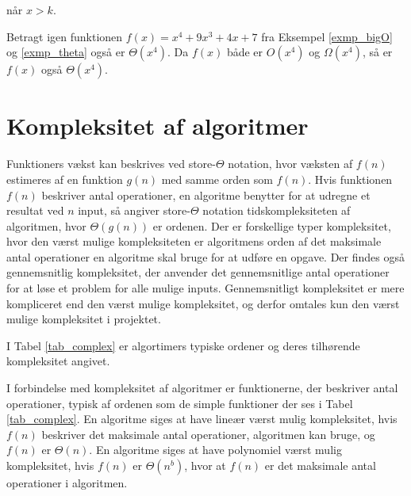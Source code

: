 når $x>k$. \\
\begin{exmp}
Betragt igen funktionen $f(x)=x^4+9x^3+4x+7$ fra Eksempel \ref{exmp_bigO} og \ref{exmp_theta} også er $\Theta(x^4)$.
Da $f(x)$ både er $O(x^4)$ og $\Omega (x^4)$, så er $f(x)$ også $\Theta (x^4)$.
\end{exmp}

\section{Kompleksitet af algoritmer}
Funktioners vækst kan beskrives ved store-$\Theta$ notation, hvor væksten af $f(n)$ estimeres af en funktion $g(n)$ med samme orden som $f(n)$. 
Hvis funktionen $f(n)$ beskriver antal operationer, en algoritme benytter for at udregne et resultat ved $n$ input, så angiver store-$\Theta$ notation tidskompleksiteten af algoritmen, hvor $\Theta(g(n))$ er ordenen. 
Der er forskellige typer kompleksitet, hvor den værst mulige kompleksiteten er algoritmens orden af det maksimale antal operationer en algoritme skal bruge for at udføre en opgave. 
Der findes også gennemsnitlig kompleksitet, der anvender det gennemsnitlige antal operationer for at løse et problem for alle mulige inputs.
Gennemsnitligt kompleksitet er mere kompliceret end den værst mulige kompleksitet, og derfor omtales kun den værst mulige kompleksitet i projektet.

I Tabel \ref{tab_complex} er algortimers typiske ordener og deres tilhørende kompleksitet angivet. 



I forbindelse med kompleksitet af algoritmer er funktionerne, der beskriver antal operationer, typisk af ordenen som de simple funktioner der ses i Tabel \ref{tab_complex}. 
En algoritme siges at have lineær værst mulig kompleksitet, hvis $f(n)$ beskriver det maksimale antal operationer,  algoritmen kan bruge, og $f(n)$ er $\Theta(n)$. 
En algoritme siges at have polynomiel værst mulig kompleksitet, hvis $f(n)$ er $\Theta(n^b)$, hvor at $f(n)$ er det maksimale antal operationer i algoritmen.

